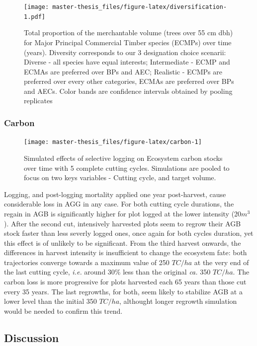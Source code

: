 \documentclass[12pt,]{article}
\theoremstyle{definition}
\theoremstyle{definition}
\theoremstyle{definition}
\theoremstyle{remark}
\begin{document}
\begin{figure}
\centering
\texttt{[image: master-thesis\_files/figure-latex/diversification-1.pdf]}
\caption{\label{fig:diversification}Total proportion of the merchantable
volume (trees over 55 cm dbh) for Major Principal Commercial Timber
species (ECMPs) over time (years). Diversity corresponds to our 3
designation choice scenarii: Diverse - all species have equal interests;
Intermediate - ECMP and ECMAs are preferred over BPs and AEC; Realistic
- ECMPs are preferred over every other categories, ECMAs are preferred
over BPs and AECs. Color bands are confidence intervals obtained by
pooling replicates}
\end{figure}

\subsubsection{Carbon}\label{carbon}

\begin{figure}
\texttt{[image: master-thesis\_files/figure-latex/carbon-1]} \caption{Simulated effects of selective logging on Ecosystem carbon stocks over time with 5 complete cutting cycles. Simulations are pooled to focus on two keys variables - Cutting cycle, and target volume.}\label{fig:carbon}
\end{figure}

Logging, and post-logging mortality applied one year post-harvest, cause
considerable loss in AGG in any case. For both cutting cycle durations,
the regain in AGB is significantly higher for plot logged at the lower
intensity (20\(m^3\)). After the second cut, intensively harvested plots
seem to regrow their AGB stock faster than less severly logged ones,
once again for both cycles duration, yet this effect is of unlikely to
be significant. From the third harvest onwards, the differences in
harvest intensity is insufficient to change the ecosystem fate: both
trajectories converge towards a maximum value of 250 \(TC/ha\) at the
very end of the last cutting cycle, \emph{i.e.} around 30\(\%\) less
than the original \emph{ca.} 350 \(TC/ha\). The carbon loss is more
progressive for plots harvested each 65 years than those cut every 35
years. The last regrowths, for both, seem likely to stabilize AGB at a
lower level than the initial 350 \(TC/ha\), althought longer regrowth
simulation would be needed to confirm this trend.

\subsection{Discussion}\label{discussion-1}
\end{document}
